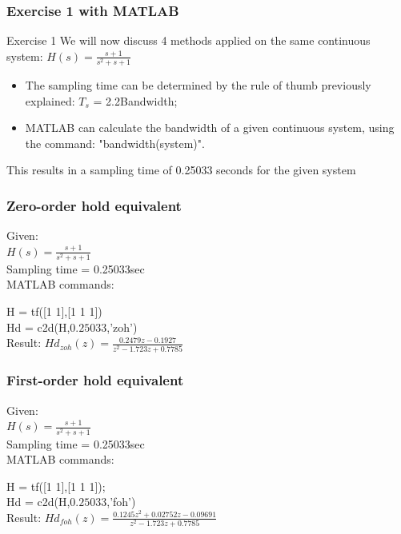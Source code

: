 \begin{frame}
	\frametitle{Exercise 1 with MATLAB}
	\begin{block}{Exercise 1}
		We will now discuss 4 methods applied on the same continuous system:
		$H(s) = \frac{s + 1}{s^{2} + s + 1}$\\
		\begin{itemize}
		\item The sampling time can be determined by the rule of thumb previously explained: $T_s$ = 2.2Bandwidth;
		\item MATLAB can calculate the bandwidth of a given continuous system, using the command: "bandwidth(system)".
		\end{itemize}
		This results in a sampling time of 0.25033 seconds for the given system
	\end{block}
\end{frame}

\begin{frame}
	\frametitle{Zero-order hold equivalent}
	\begin{example}
		Given:\\
		$H(s) = \frac{s + 1}{s^{2} + s + 1}$\\
		Sampling time = 0.25033sec\\
		\vspace{0.8em}
		MATLAB commands:
		
		H = tf([1 1],[1 1 1]) \\
		Hd = c2d(H,$0.25033$,'zoh')\\
		\vspace{0.8em}
		Result:
		$Hd_{zoh}(z) = \frac{0.2479z - 0.1927}{z^{2} -1.723z + 0.7785}$
	\end{example}
\end{frame}

\begin{frame}
	\frametitle{First-order hold equivalent}
	\begin{example}
		Given:\\
		$H(s) = \frac{s + 1}{s^{2} + s + 1}$\\
		Sampling time = 0.25033sec\\
		\vspace{1em}
		MATLAB commands:
	
		H = tf([1 1],[1 1 1]); \\
		Hd = c2d(H,$0.25033$,'foh')\\
		\vspace{1em}
		Result:
		$Hd_{foh}(z) = \frac{0.1245z^{2} + 0.02752z - 0.09691}{z^{2} - 1.723z + 0.7785}$
	\end{example}
\end{frame}

